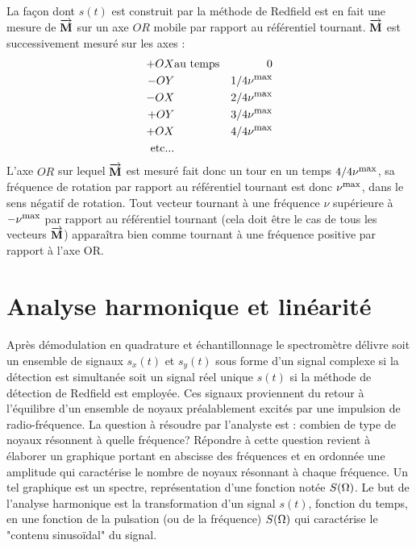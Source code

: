 La façon dont $s(t)$ est construit par la méthode de Redfield
est en fait une mesure de $\overrightarrow{\mathbf{M}}$ sur un axe $OR$ mobile par
rapport au référentiel tournant.
$\overrightarrow{\mathbf{M}}$ est successivement mesuré sur les axes :
\begin{eqnarray}
+OX		& \mbox{au temps} &		0 \\
-OY		& &			1/4\nu^{\mbox{\footnotesize{max}}} \\
-OX		& &			2/4\nu^{\mbox{\footnotesize{max}}} \\
+OY		& &			3/4\nu^{\mbox{\footnotesize{max}}} \\
+OX		& &			4/4\nu^{\mbox{\footnotesize{max}}} \\
\mbox{etc...}& &
\end{eqnarray}
L'axe $OR$ sur lequel $\overrightarrow{\mathbf{M}}$ est mesuré fait donc un tour en un temps $4/4\nu^{\mbox{\footnotesize{max}}}$,
sa fréquence de rotation par rapport au référentiel tournant est donc $\nu^{\mbox{\footnotesize{max}}}$,
dans le sens négatif de rotation.
Tout vecteur tournant à une fréquence $\nu$ supérieure à $-\nu^{\mbox{\footnotesize{max}}}$ par rapport au
référentiel tournant (cela doit être le cas de tous les vecteurs $\overrightarrow{\mathbf{M}}$) apparaîtra 
bien comme
tournant à une fréquence positive par rapport à l'axe OR.

\section{Analyse harmonique et linéarité}
\label{sec:ft}
Après démodulation en quadrature et échantillonnage le spectromètre délivre soit un 
ensemble de signaux $s_x(t)$ et $s_y(t)$ sous forme d'un signal complexe
si la détection est simultanée soit un signal réel unique $s(t)$ 
si la méthode de détection de Redfield est employée. 
Ces signaux proviennent du retour 
à l'équilibre d'un ensemble de noyaux préalablement excités par une impulsion de 
radio-fréquence. 
La  question à résoudre par l'analyste est : combien de type de noyaux résonnent à quelle 
fréquence? 
Répondre à cette question revient à élaborer un graphique portant en 
abscisse des fréquences et en ordonnée une amplitude qui caractérise le nombre de 
noyaux résonnant à chaque fréquence. 
Un tel graphique est un spectre, représentation 
d'une fonction notée $S(\Omega)$. 
Le but de l'analyse harmonique est la transformation d'un 
signal $s(t)$, fonction du temps, 
en une fonction de la pulsation (ou de la fréquence) $S(\Omega)$ 
qui caractérise le "contenu sinusoïdal" du signal.


